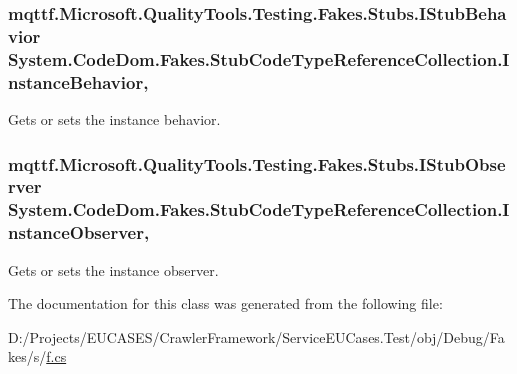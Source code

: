\hypertarget{class_system_1_1_code_dom_1_1_fakes_1_1_stub_code_type_reference_collection_a91b4dfcb06e546599de56bcebc00fabf}{
\subsubsection[{Instance\-Behavior}]{\setlength{\rightskip}{0pt plus 5cm}mqttf.\-Microsoft.\-Quality\-Tools.\-Testing.\-Fakes.\-Stubs.\-I\-Stub\-Behavior System.\-Code\-Dom.\-Fakes.\-Stub\-Code\-Type\-Reference\-Collection.\-Instance\-Behavior\hspace{0.3cm}{\ttfamily [get]}, {\ttfamily [set]}}}\label{class_system_1_1_code_dom_1_1_fakes_1_1_stub_code_type_reference_collection_a91b4dfcb06e546599de56bcebc00fabf}


Gets or sets the instance behavior.

\hypertarget{class_system_1_1_code_dom_1_1_fakes_1_1_stub_code_type_reference_collection_a0edc917032d339dc9972ccc1490642df}{
\subsubsection[{Instance\-Observer}]{\setlength{\rightskip}{0pt plus 5cm}mqttf.\-Microsoft.\-Quality\-Tools.\-Testing.\-Fakes.\-Stubs.\-I\-Stub\-Observer System.\-Code\-Dom.\-Fakes.\-Stub\-Code\-Type\-Reference\-Collection.\-Instance\-Observer\hspace{0.3cm}{\ttfamily [get]}, {\ttfamily [set]}}}\label{class_system_1_1_code_dom_1_1_fakes_1_1_stub_code_type_reference_collection_a0edc917032d339dc9972ccc1490642df}


Gets or sets the instance observer.



The documentation for this class was generated from the following file\-:\begin{DoxyCompactItemize}
\item 
D\-:/\-Projects/\-E\-U\-C\-A\-S\-E\-S/\-Crawler\-Framework/\-Service\-E\-U\-Cases.\-Test/obj/\-Debug/\-Fakes/s/\hyperlink{s_2f_8cs}{f.\-cs}\end{DoxyCompactItemize}
